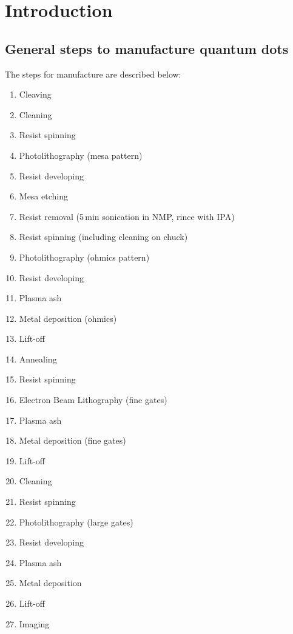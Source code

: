 \documentclass[12pt,a4paper]{report}
\begin{document}
\section{Introduction}

\subsection{General steps to manufacture quantum dots}

The steps for manufacture are described below:\\

\begin{enumerate}[noitemsep]
\item Cleaving
\item Cleaning
\item Resist spinning
\item Photolithography (mesa pattern)
\item Resist developing
\item Mesa etching
\item Resist removal (5\,min sonication in NMP, rince with IPA)
\item Resist spinning (including cleaning on chuck)
\item Photolithography (ohmics pattern)
\item Resist developing
\item Plasma ash
\item Metal deposition (ohmics)
\item Lift-off
\item Annealing
\item Resist spinning
\item Electron Beam Lithography (fine gates)
\item Plasma ash
\item Metal deposition (fine gates)
\item Lift-off
\item Cleaning
\item Resist spinning
\item Photolithography (large gates)
\item Resist developing
\item Plasma ash
\item Metal deposition
\item Lift-off
\item Imaging
\end{enumerate}

\newpage
\end{document}

